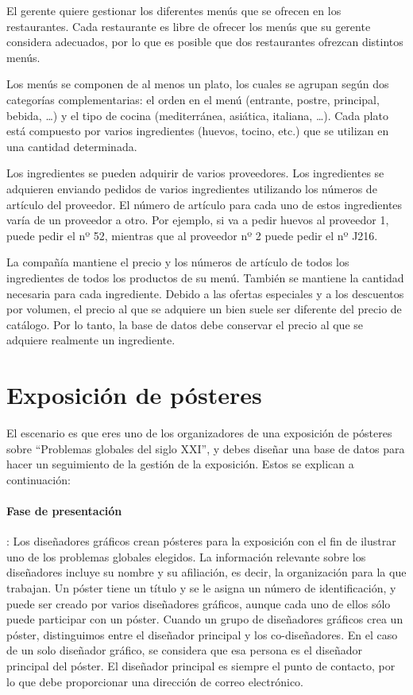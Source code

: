\documentclass[a4paper]{article}
\begin{document}
El gerente quiere gestionar los diferentes menús que se ofrecen en los restaurantes. Cada restaurante es libre de ofrecer los menús que su gerente considera adecuados, por lo que es posible que dos restaurantes ofrezcan distintos menús.

Los menús se componen de al menos un plato, los cuales se agrupan según dos categorías complementarias: el orden en el menú (entrante, postre, principal, bebida, \ldots) y el tipo de cocina (mediterránea, asiática, italiana, \ldots). Cada plato está compuesto por varios ingredientes (huevos, tocino, etc.) que se utilizan en una cantidad determinada.

Los ingredientes se pueden adquirir de varios proveedores. Los ingredientes se adquieren enviando pedidos de varios ingredientes utilizando los números de artículo del proveedor. El número de artículo para cada uno de estos ingredientes varía de un proveedor a otro. Por ejemplo, si va a pedir huevos al proveedor 1, puede pedir el nº 52, mientras que al proveedor nº 2 puede pedir el nº J216. 

La compañía mantiene el precio y los números de artículo de todos los ingredientes de todos los productos de su menú. También se mantiene la cantidad necesaria para cada ingrediente. Debido a las ofertas especiales y a los descuentos por volumen, el precio al que se adquiere un bien suele ser diferente del precio de catálogo. Por lo tanto, la base de datos debe conservar el precio al que se adquiere realmente un ingrediente.

\section{Exposición de pósteres}
El escenario es que eres uno de los organizadores de una exposición de pósteres sobre ``Problemas globales del siglo XXI'', y debes diseñar una base de datos para hacer un seguimiento de la gestión de la exposición.  Estos se explican a continuación:

\paragraph{Fase de presentación}: Los diseñadores gráficos crean pósteres para la exposición con el fin de ilustrar uno de los problemas globales elegidos.  La información relevante sobre los diseñadores incluye su nombre y su afiliación, es decir, la organización para la que trabajan.  Un póster tiene un título y se le asigna un número de identificación, y puede ser creado por varios diseñadores gráficos, aunque cada uno de ellos sólo puede participar con un póster.  Cuando un grupo de diseñadores gráficos crea un póster, distinguimos entre el diseñador principal y los co-diseñadores.  En el caso de un solo diseñador gráfico, se considera que esa persona es el diseñador principal del póster.  El diseñador principal es siempre el punto de contacto, por lo que debe proporcionar una dirección de correo electrónico.
\end{document}
